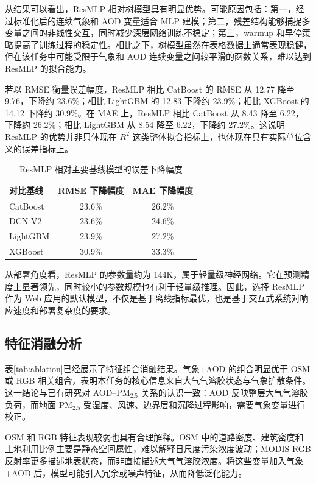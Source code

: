\documentclass[UTF8,zihao=-4,a4paper]{ctexart}
\newcommand{\pmfine}{PM$_{2.5}$}
\newcommand{\aod}{AOD}
\begin{document}
从结果可以看出，ResMLP 相对树模型具有明显优势。可能原因包括：第一，经过标准化后的连续气象和 \aod{} 变量适合 MLP 建模；第二，残差结构能够捕捉多变量之间的非线性交互，同时减少深层网络训练不稳定；第三，warmup 和早停策略提高了训练过程的稳定性。相比之下，树模型虽然在表格数据上通常表现稳健，但在该任务中可能受限于气象和 \aod{} 连续变量之间较平滑的函数关系，难以达到 ResMLP 的拟合能力。

若以 RMSE 衡量误差幅度，ResMLP 相比 CatBoost 的 RMSE 从 12.77 降至 9.76，下降约 23.6\%；相比 LightGBM 的 12.83 下降约 23.9\%；相比 XGBoost 的 14.12 下降约 30.9\%。在 MAE 上，ResMLP 相比 CatBoost 从 8.43 降至 6.22，下降约 26.2\%；相比 LightGBM 从 8.54 降至 6.22，下降约 27.2\%。这说明 ResMLP 的优势并非只体现在 $R^2$ 这类整体拟合指标上，也体现在具有实际单位含义的误差指标上。

\begin{table}[H]
  \centering
  \caption{ResMLP 相对主要基线模型的误差下降幅度}
  \label{tab:relative_improvement}
  \begin{tabular}{lcc}
    \toprule
    对比基线 & RMSE 下降幅度 & MAE 下降幅度 \\
    \midrule
    CatBoost & 23.6\% & 26.2\% \\
    DCN-V2 & 23.6\% & 24.6\% \\
    LightGBM & 23.9\% & 27.2\% \\
    XGBoost & 30.9\% & 33.3\% \\
    \bottomrule
  \end{tabular}
\end{table}

从部署角度看，ResMLP 的参数量约为 144K，属于轻量级神经网络。它在预测精度上显著领先，同时较小的参数规模也有利于轻量级推理。因此，选择 ResMLP 作为 Web 应用的默认模型，不仅是基于离线指标最优，也是基于交互式系统对响应速度和部署复杂度的要求。

\subsection{特征消融分析}

表\ref{tab:ablation}已经展示了特征组合消融结果。气象+\aod{} 的组合明显优于 OSM 或 RGB 相关组合，表明本任务的核心信息来自大气气溶胶状态与气象扩散条件。这一结论与已有研究对 \aod{}--\pmfine{} 关系的认识一致：\aod{} 反映整层大气气溶胶负荷，而地面 \pmfine{} 受湿度、风速、边界层和沉降过程影响，需要气象变量进行校正\cite{xin2016,zheng2017}。

OSM 和 RGB 特征表现较弱也具有合理解释。OSM 中的道路密度、建筑密度和土地利用比例主要是静态空间属性，难以解释日尺度污染浓度波动；MODIS RGB 反射率更多描述地表状态，而非直接描述大气气溶胶浓度。将这些变量加入气象+\aod{} 后，模型可能引入冗余或噪声特征，从而降低泛化能力。
\end{document}
